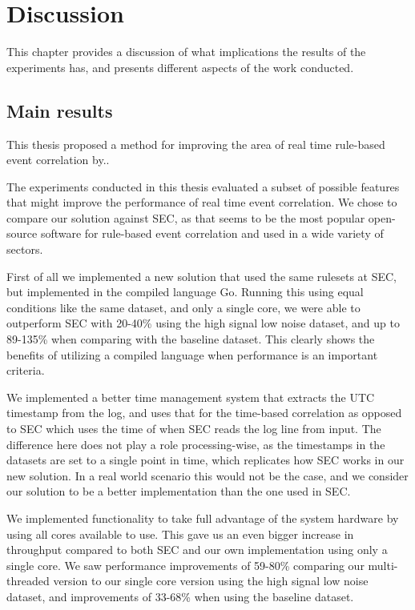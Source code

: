 \chapter{Discussion}
\label{chap:discussion}
This chapter provides a discussion of what implications the results of the experiments has, and presents different aspects of the work conducted.

\iffalse
Interpretations: what do the results mean?
Implications: why do the results matter?
Limitations: what can’t the results tell us?
Recommendations: what practical actions or scientific studies should follow?
\fi

\section{Main results}

This thesis proposed a method for improving the area of real time rule-based event correlation by..

The experiments conducted in this thesis evaluated a subset of possible features that might improve the performance of real time event correlation.
We chose to compare our solution against SEC, as that seems to be the most popular open-source software for rule-based event correlation and used in a wide variety of sectors. 

First of all we implemented a new solution that used the same rulesets at SEC, but implemented in the compiled language Go. Running this using equal conditions like the same dataset, and only a single core, we were able to outperform SEC with 20-40\% using the high signal low noise dataset, and up to 89-135\% when comparing with the baseline dataset. This clearly shows the benefits of utilizing a compiled language when performance is an important criteria.

We implemented a better time management system that extracts the UTC timestamp from the log, and uses that for the time-based correlation as opposed to SEC which uses the time of when SEC reads the log line from input. The difference here does not play a role processing-wise, as the timestamps in the datasets are set to a single point in time, which replicates how SEC works in our new solution. In a real world scenario this would not be the case, and we consider our solution to be a better implementation than the one used in SEC.

We implemented functionality to take full advantage of the system hardware by using all cores available to use. This gave us an even bigger increase in throughput compared to both SEC and our own implementation using only a single core. We saw performance improvements of 59-80\% comparing our multi-threaded version to our single core version using the high signal low noise dataset, and improvements of 33-68\% when using the baseline dataset.

